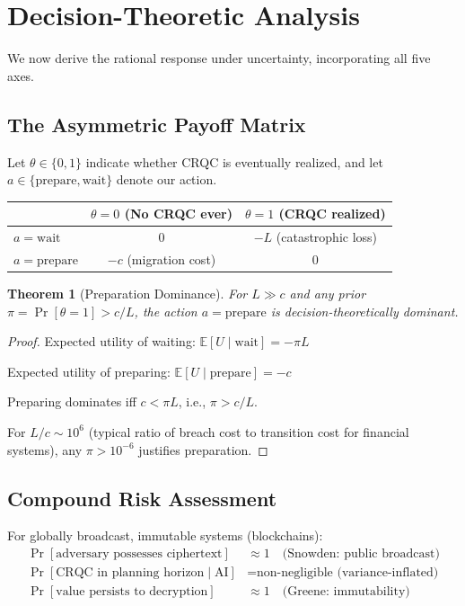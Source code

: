 \documentclass[11pt,a4paper]{article}
\newtheorem{theorem}{Theorem}[section]
\begin{document}
\section{Decision-Theoretic Analysis}

We now derive the rational response under uncertainty, incorporating all five axes.

\subsection{The Asymmetric Payoff Matrix}

Let $\theta \in \{0, 1\}$ indicate whether CRQC is eventually realized, and let $a \in \{\text{prepare}, \text{wait}\}$ denote our action.

\begin{center}
\begin{tabular}{lcc}
\toprule
& $\theta = 0$ (No CRQC ever) & $\theta = 1$ (CRQC realized) \\
\midrule
$a = \text{wait}$ & 0 & $-L$ (catastrophic loss) \\
$a = \text{prepare}$ & $-c$ (migration cost) & 0 \\
\bottomrule
\end{tabular}
\end{center}

\begin{theorem}[Preparation Dominance]
For $L \gg c$ and any prior $\pi = \Pr[\theta = 1] > c/L$, the action $a = \text{prepare}$ is decision-theoretically dominant.
\end{theorem}

\begin{proof}
Expected utility of waiting: $\mathbb{E}[U \mid \text{wait}] = -\pi L$

Expected utility of preparing: $\mathbb{E}[U \mid \text{prepare}] = -c$

Preparing dominates iff $c < \pi L$, i.e., $\pi > c/L$.

For $L/c \sim 10^6$ (typical ratio of breach cost to transition cost for financial systems), any $\pi > 10^{-6}$ justifies preparation.
\end{proof}

\subsection{Compound Risk Assessment}

For globally broadcast, immutable systems (blockchains):
\begin{align}
\Pr[\text{adversary possesses ciphertext}] &\approx 1 \quad \text{(Snowden: public broadcast)} \\
\Pr[\text{CRQC in planning horizon} \mid \text{AI}] &= \text{non-negligible (variance-inflated)} \\
\Pr[\text{value persists to decryption}] &\approx 1 \quad \text{(Greene: immutability)}
\end{align}
\end{document}
